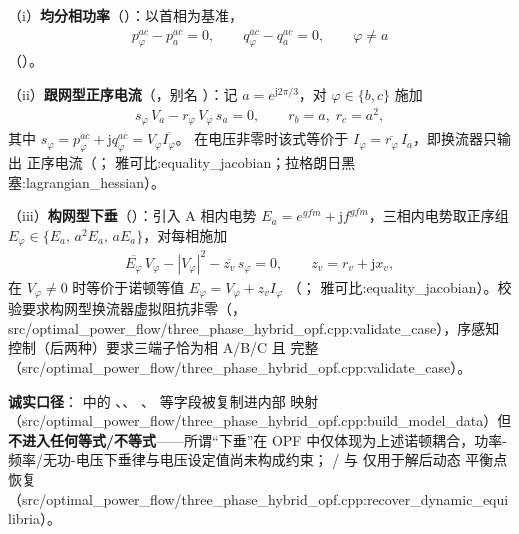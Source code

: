 （i）\textbf{均分相功率}（）：以首相为基准，
\begin{align*}
p^{ac}_{\varphi} - p^{ac}_{a} = 0,\qquad
q^{ac}_{\varphi} - q^{ac}_{a} = 0,\qquad \varphi\neq a
\end{align*}
（）。

（ii）\textbf{跟网型正序电流}（，别名
）：记 $a=e^{\mathrm{j}2\pi/3}$，对
$\varphi\in\{b,c\}$ 施加
\begin{align*}
s_{\varphi}\,V_a - r_{\varphi}\,V_{\varphi}\,s_a = 0,\qquad
r_b=a,\; r_c=a^{2},
\end{align*}
其中 $s_\varphi=p^{ac}_\varphi+\mathrm{j}q^{ac}_\varphi=V_\varphi\overline{I_\varphi}$。
在电压非零时该式等价于 $I_\varphi=\overline{r_\varphi}\,I_a$，即换流器只输出
正序电流（；
雅可比:equality\_jacobian；拉格朗日黑塞:lagrangian\_hessian）。

（iii）\textbf{构网型下垂}（）：引入 A 相内电势
$E_a=e^{gfm}+\mathrm{j}f^{gfm}$，三相内电势取正序组
$E_\varphi\in\{E_a,\,a^{2}E_a,\,aE_a\}$，对每相施加
\begin{align*}
\overline{E_\varphi}\,V_\varphi - |V_\varphi|^{2} - \overline{z_v}\,s_\varphi = 0,
\qquad z_v = r_v + \mathrm{j}x_v,
\end{align*}
在 $V_\varphi\neq 0$ 时等价于诺顿等值 $E_\varphi = V_\varphi + z_v I_\varphi$
（；
雅可比:equality\_jacobian）。校验要求构网型换流器虚拟阻抗非零（，
src/optimal\_power\_flow/three\_phase\_hybrid\_opf.cpp:validate\_case），序感知控制（后两种）要求三端子恰为相 A/B/C 且
 完整（src/optimal\_power\_flow/three\_phase\_hybrid\_opf.cpp:validate\_case）。

\textbf{诚实口径}： 中的 、、
、 等字段被复制进内部
映射（src/optimal\_power\_flow/three\_phase\_hybrid\_opf.cpp:build\_model\_data）但\textbf{不进入任何等式/不等式}——所谓“下垂”在 OPF
中仅体现为上述诺顿耦合，功率-频率/无功-电压下垂律与电压设定值尚未构成约束；
/ 与  仅用于解后动态
平衡点恢复（src/optimal\_power\_flow/three\_phase\_hybrid\_opf.cpp:recover\_dynamic\_equilibria）。

